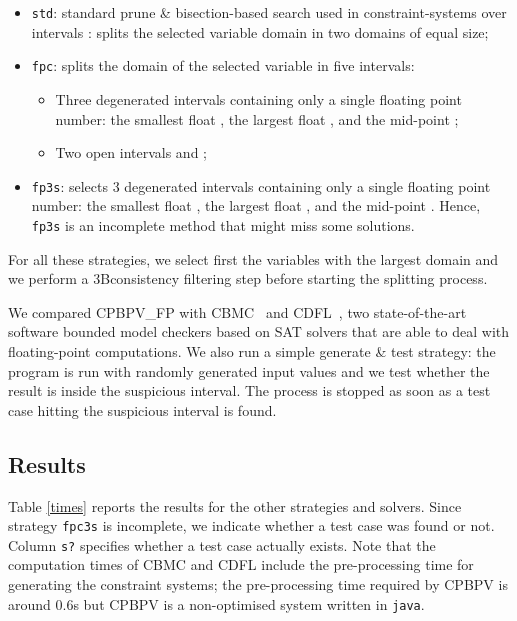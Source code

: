 \documentclass[a4paper]{llncs}
\newcommand{\CBMC}{\textsc{CBMC}}
\newcommand{\CDFL}{\textsc{CDFL}}
\newcommand{\CPBPV}{\textsc{CPBPV}}
\newcommand{\OUR}{\textsc{CPBPV\_FP}}
\begin{document}
\begin{itemize}
\item \lstinline|std|: standard prune \& bisection-based search used in constraint-systems over intervals : splits the selected variable domain in two  domains of equal size;
\item \lstinline|fpc|: splits the domain of the selected variable in five  intervals: 
\begin{itemize}
\item Three degenerated intervals containing only a single floating point number: the smallest float , the largest float , and the mid-point ;
\item Two open intervals  and ;
\end{itemize}
\item \lstinline|fp3s|: selects 3 degenerated intervals containing only a single floating point number: the smallest float , the largest float , and the  mid-point .
Hence, \lstinline|fp3s| is an incomplete method that might miss some solutions.
\end{itemize}


For all these strategies, we select first the variables with the
largest domain and we perform a 3Bconsistency filtering step
before starting the splitting process.

We compared \OUR{} with  \CBMC{}~\cite{clarkeKroeningLerda04} and
\CDFL{}~\cite{DHKT12}, two state-of-the-art software bounded model checkers based on SAT solvers that are  able
to deal with floating-point computations. 
We also run a simple generate \& test strategy: the program is run
with randomly generated input values and we test whether the result is
inside the suspicious interval. The process is stopped as soon as a
test case hitting the suspicious interval is found.

\subsection{ Results } 

Table \ref{times} reports the results for the other strategies and
solvers. Since strategy \lstinline|fpc3s| is incomplete, we indicate whether
a test case was found or not. Column \lstinline|s?| specifies whether a test case actually exists. Note that the computation times of \CBMC{} and \CDFL{}
include the pre-processing time for generating the constraint systems;
the pre-processing time required by \CPBPV{} is around 0.6s
but \CPBPV{} is a non-optimised system written in \lstinline|java|.
\end{document}
